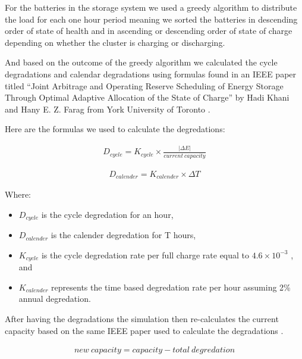 \documentclass[conference]{IEEEtran}
\begin{document}
For the batteries in the storage system we used a greedy algorithm to distribute the load for each one hour period meaning we sorted the batteries in descending order of state of health and in ascending or descending order of state of charge depending on whether the cluster is charging or discharging.

And based on the outcome of the greedy algorithm we calculated the cycle degradations and calendar degradations using formulas found in an IEEE paper titled “Joint Arbitrage and Operating Reserve Scheduling of Energy Storage Through Optimal Adaptive Allocation of the State of Charge” by Hadi Khani and Hany E. Z. Farag from York University of Toronto \cite{b10}.

Here are the formulas we used to calculate the degredations:

\begin{equation}
\begin{aligned}
	D_{cycle} = K_{cycle} \times \frac{| \Delta E |}{current \ capacity}
\end{aligned}
\end{equation}

\begin{equation}
\begin{aligned}
	D_{calender} = K_{calender} \times \Delta{T}
\end{aligned}
\end{equation}

Where:
\begin{itemize}
    \item \( D_{cycle} \) is the cycle degredation for an hour,
    \item \( D_{calender} \) is the calender degredation for T hours,
    \item \( K_{cycle} \) is the cycle degredation rate per full charge rate equal to $ 4.6 \times 10^{-3}$ , and
    \item \( K_{calender} \) represents the time based degredation rate per hour assuming 2\% annual degredation.
\end{itemize}

After having the degradations the simulation then re-calculates the current capacity based on the same IEEE paper used to calculate the degradations \cite{b10}.

\begin{equation}
\begin{aligned}
	new \ capacity = capacity - total \ degredation
\end{aligned}
\end{equation}
\end{document}

